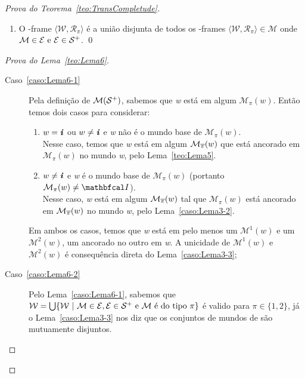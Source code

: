 \begin{apendicesenv}
\begin{proof}[Prova do Teorema~\ref{teo:TransCompletude}]
\begin{lema}
\begin{enumerate}[label=\textnormal{\ref{teo:Lema6}.\arabic*}]
                    \item \textnormal{O \PI-frame \(\langle \mathcal{W}, \mathcal{R}_{\pi} \rangle\) é a união disjunta de todos os \PI-frames
                    \(\langle \mathcal{W}, \mathcal{R}_{\pi} \rangle \in \mathcal{M}\) onde \(\mathcal{M} \in \mathcal{E} \text{ e } \mathcal{E} \in \mathcal{S}^{+}\).} \label{caso:Lema6-2} \qed
                \end{enumerate}
            \end{lema}

            \begin{proof}[Prova do Lema~\ref{teo:Lema6}]
                \phantom{a}
                \begin{description}
                    \item[Caso~\ref{caso:Lema6-1}] Pela definição de \(\mathcal{M}(\mathcal{S}^{+})\), sabemos que \textit{w} está em algum \PImodelo \(\mathcal{M}_{\pi}(w)\).
                    Então temos dois casos para considerar:
                    \begin{enumerate}[label=(\roman*)]
                        \item \(w = \textbf{\textit{i}}\) ou \(w \neq \textbf{\textit{i}}\) e \textit{w} não é o mundo base de \(\mathcal{M}_{\pi}(w)\).\\
                            Nesse caso, temos que \textit{w} está em algum \OPImodelo \(\mathcal{M}_{\overline{\pi}}(w)\) que está ancorado em \(\mathcal{M}_{\pi}(w)\)
                            no mundo \textit{w}, pelo Lema~\ref{teo:Lema5}.

                        \item \(w \neq \textbf{\textit{i}}\) e \textit{w} é o mundo base de \(\mathcal{M}_{\pi}(w)\) (portanto \(\mathcal{M}_{\pi}(w) \neq \modeloinicial\)).\\
                            Nesse caso, \textit{w} está em algum \OPImodelo \(\mathcal{M}_{\overline{\pi}}(w)\) tal que \(\mathcal{M}_{\pi}(w)\) está ancorado em \(\mathcal{M}_{\overline{\pi}}(w)\)
                            no mundo \textit{w}, pelo Lema~\ref{caso:Lema3-2}.
                    \end{enumerate}
                    Em ambos os casos, temos que \textit{w} está em pelo menos um \(\mathcal{M}^{1}(w)\) e um \(\mathcal{M}^{2}(w)\), um ancorado no outro em \textit{w}.
                    A unicidade de \(\mathcal{M}^{1}(w)\) e \(\mathcal{M}^{2}(w)\) é consequência direta do Lema~\ref{caso:Lema3-3};

                    \item[Caso~\ref{caso:Lema6-2}] Pelo Lema~\ref{caso:Lema6-1}, sabemos que \(\mathcal{W} = \bigcup\{\mathcal{W} \ | \ \mathcal{M} \in \mathcal{E}, \mathcal{E} \in \mathcal{S}^{+}
                    \text{ e \Mathcal{M} é do tipo \PI}\}\) é valido para \(\pi \in \{1,2\}\), já o Lema~\ref{caso:Lema3-3} nos diz que os conjuntos de mundos de \PImodelos são mutuamente disjuntos.
                    \qedhere
                \end{description}
            \end{proof}


\end{proof}
\end{apendicesenv}
